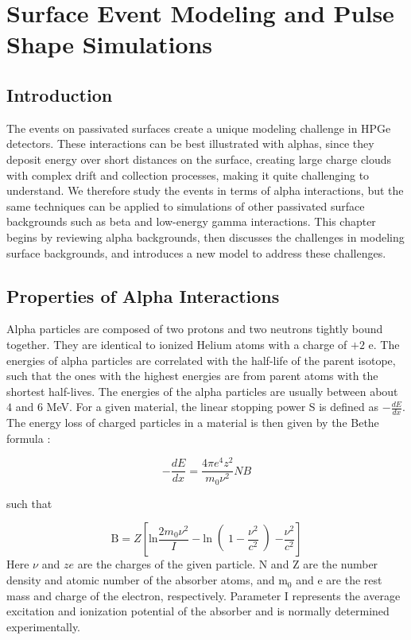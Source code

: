 \chapter{Surface Event Modeling and Pulse Shape Simulations}

\section{Introduction}
The events on passivated surfaces create a unique modeling challenge in HPGe detectors. These interactions can be best illustrated with alphas, since they deposit energy over short distances on the surface, creating large charge clouds with complex drift and collection processes, making it quite challenging to understand. We therefore study the events in terms of alpha interactions, but the same techniques can be applied to simulations of other passivated surface backgrounds such as beta and low-energy gamma interactions. This chapter begins by reviewing alpha backgrounds, then discusses the challenges in modeling surface backgrounds, and introduces a new model to address these challenges.


\section{Properties of Alpha Interactions}
Alpha particles are composed of two protons and two neutrons tightly bound together. They are identical to ionized Helium atoms with a charge of $+2$ e. The energies of alpha particles are correlated with the half-life of the parent isotope, such that the ones with the highest energies are from parent atoms with the shortest half-lives. The energies of the alpha particles are usually between about $4$ and $6$ MeV. For a given material, the linear stopping power S is defined as $-\frac{dE}{dx}$. The energy loss of charged particles in a material is then given by the Bethe formula \cite{Bethe1953}:

\begin{equation}\label{bethe_formula}
    -\frac{dE}{dx} = \frac{4\pi e^4z^2}{m_0\nu^2}NB
\end{equation}

\noindent
such that

\begin{equation}\label{bethe_B}
    \text{B}=Z\left[ \text{ln}\frac{2m_0\nu^2}{I}-\text{ln}\right(1-\frac{\nu^2}{c^2}\left)-\frac{\nu^2}{c^2}\right]
\end{equation}
\noindent
Here $\nu$ and $ze$ are the charges of the given particle. N and Z are the number density and atomic number of the absorber atoms, and m$_0$ and e are the rest mass and charge of the electron, respectively. Parameter I represents the average excitation and ionization potential of the absorber and is normally determined experimentally. 

